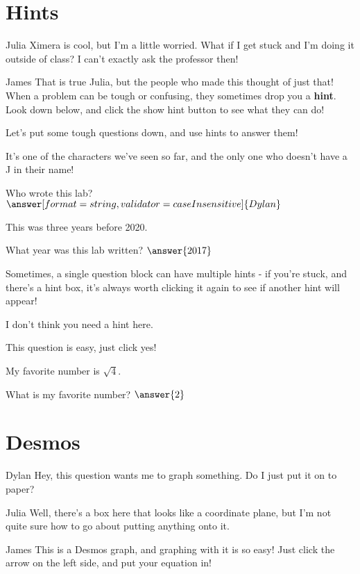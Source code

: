 \documentclass{ximera}
\begin{document}
\section{Hints}
\begin{dialogue}
\item[Julia] Ximera is cool, but I'm a little worried. What if I get stuck and I'm doing it outside of class? I can't exactly ask the professor then!
\item[James] That is true Julia, but the people who made this thought of just that! When a problem can be tough or confusing, they sometimes drop you a \textbf{hint}. Look down below, and click the show hint button to see what they can do!
\end{dialogue}

Let's put some tough questions down, and use hints to answer them!
\begin{question}
\begin{hint}
It's one of the characters we've seen so far, and the only one who doesn't have a J in their name!
\end{hint}
Who wrote this lab?
$\answer[format=string,validator=caseInsensitive]{Dylan}$
\end{question}
\begin{question}
\begin{hint}
This was three years before 2020.
\end{hint}
What year was this lab written?
$\answer{2017}$
\end{question}

Sometimes, a single question block can have multiple hints - if you're stuck, and there's a hint box, it's always worth clicking it again to see if another hint will appear!

\begin{question}
\begin{hint}
I don't think you need a hint here.
\end{hint}
This question is easy, just click yes!
\begin{multipleChoice}
\end{multipleChoice}

\begin{hint}
My favorite number is $\sqrt{4}$.
\end{hint}
What is my favorite number?
$\answer{2}$
\end{question}

\section{Desmos}
\begin{dialogue}
\item[Dylan] Hey, this question wants me to graph something. Do I just put it on to paper?
\item[Julia] Well, there's a box here that looks like a coordinate plane, but I'm not quite sure how to go about putting anything onto it.
\item[James] This is a Desmos graph, and graphing with it is so easy! Just click the arrow on the left side, and put your equation in!
\end{dialogue}
\end{document}
